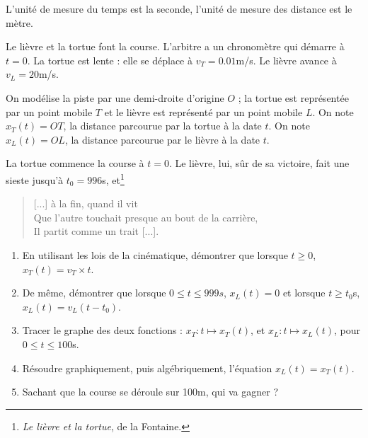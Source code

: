			\begin{exo}
				L'unité de mesure du temps est la seconde, l'unité de mesure des distance est le mètre.

				Le lièvre et la tortue font la course. L'arbitre a un chronomètre qui démarre à $t=0$. La tortue est lente : elle se déplace à $v_T=0.01$m/s. Le lièvre avance à $v_L=20$m/s. 

				On modélise la piste par une demi-droite d'origine $O$ ; la tortue est représentée par un point mobile $T$ et le lièvre est représenté par un point mobile $L$. On note $x_T(t)=OT$, la distance parcourue par la tortue à la date $t$. On note $x_L(t)=OL$, la distance parcourue par le lièvre à la date $t$. 

				La tortue commence la course à $t=0$. Le lièvre, lui, sûr de sa victoire, fait une sieste jusqu'à $t_0=996$s, et\footnote{\emph{Le lièvre et la tortue}, de la Fontaine.}
				\begin{quote}
					[...] à la fin, quand il  vit \\
				  Que l'autre touchait presque au bout de la carrière, \\
				  Il partit comme un trait [...].
				\end{quote}

				\begin{enumerate}
					\item En utilisant les lois de la cinématique, démontrer que lorsque $t\ge0$, $x_T(t)=v_T\times t$.
					\item De même, démontrer que lorsque $0\le t\le 999s$, $x_L(t)=0$ et lorsque $t\ge t_0$s, $x_L(t)=v_L(t-t_0)$.
					\item Tracer le graphe des deux fonctions : $x_T: t\mapsto x_T(t)$, et $x_L:t\mapsto x_L(t)$, pour $0\le t\le 100$s.
					\item Résoudre graphiquement, puis algébriquement, l'équation $x_L(t)=x_T(t)$.
					\item Sachant que la course se déroule sur 100m, qui va gagner ?
				\end{enumerate}
			\end{exo}





